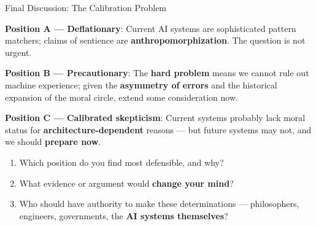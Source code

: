 \documentclass[aspectratio=169,11pt]{beamer}
\begin{document}
\begin{frame}[shrink=5]{Final Discussion: The Calibration Problem}
\begin{discussionbox}
\small
\textbf{Position A --- Deflationary}: Current AI systems are sophisticated pattern matchers; claims of sentience are \textbf{anthropomorphization}. The question is not urgent.

\vspace{0.1cm}
\textbf{Position B --- Precautionary}: The \textbf{hard problem} means we cannot rule out machine experience; given the \textbf{asymmetry of errors} and the historical expansion of the moral circle, extend some consideration now.

\vspace{0.1cm}
\textbf{Position C --- Calibrated skepticism}: Current systems probably lack moral status for \textbf{architecture-dependent} reasons --- but future systems may not, and we should \textbf{prepare now}.

\vspace{0.1cm}
\begin{enumerate}
    \item Which position do you find most defensible, and why?
    \item What evidence or argument would \textbf{change your mind}?
    \item Who should have authority to make these determinations --- philosophers, engineers, governments, the \textbf{AI systems themselves}?
\end{enumerate}
\end{discussionbox}
\end{frame}
\end{document}
